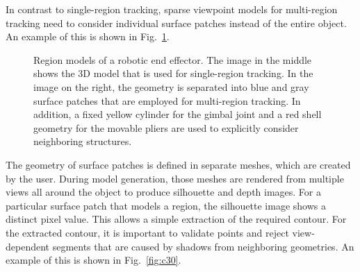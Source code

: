 \documentclass[letterpaper, 10 pt, conference]{ieeeconf}
\begin{document}
In contrast to single-region tracking, sparse viewpoint models for multi-region tracking need to consider individual surface patches instead of the entire object.
An example of this is shown in Fig.~\ref{fig:c34}.
\begin{figure}[t]
	\centering
	

 	\caption{
		Region models of a robotic end effector.
		The image in the middle shows the 3D model that is used for single-region tracking.
		In the image on the right, the geometry is separated into blue and gray surface patches that are employed for multi-region tracking.
		In addition, a fixed yellow cylinder for the gimbal joint and a red shell geometry for the movable pliers are used to explicitly consider neighboring structures.
	}
	\label{fig:c34}
\end{figure}The geometry of surface patches is defined in separate meshes, which are created by the user.
During model generation, those meshes are rendered from multiple views all around the object to produce silhouette and depth images.
For a particular surface patch that models a region, the silhouette image shows a distinct pixel value.
This allows a simple extraction of the required contour.
For the extracted contour, it is important to validate points and reject view-dependent segments that are caused by shadows from neighboring geometries.
An example of this is shown in Fig.~\ref{fig:c30}.
\end{document}
